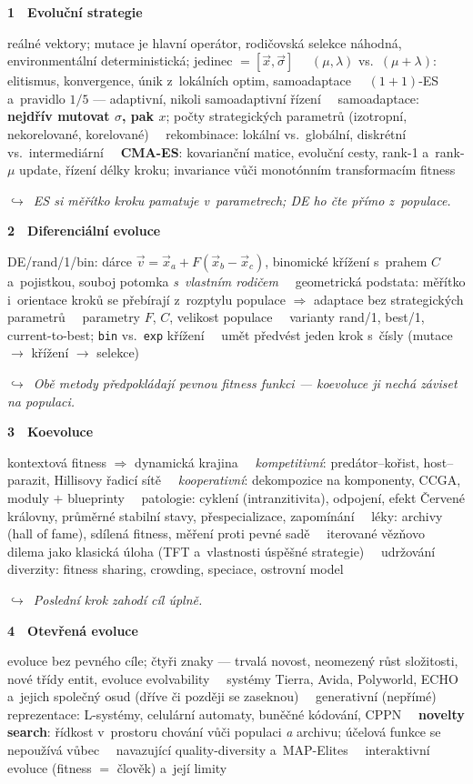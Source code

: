 \documentclass[11pt,a4paper]{article}
\newcommand{\tb}{\ \textcolor{defframe}{\textbullet}\ }
\newcommand{\blok}[2]{\par\addvspace{2.4mm}\noindent
  \textcolor{blokcol}{\textbf{#1}}\ \ \textbf{#2}\par\nobreak}
\newcommand{\tema}[1]{\par\nobreak\noindent #1\par}
\newcommand{\most}[1]{\par\nobreak\noindent
  {\small\itshape\textcolor{mostcol}{$\hookrightarrow$\ #1}}\par}
\begin{document}
\blok{1}{Evoluční strategie}
\tema{reálné vektory; mutace je hlavní operátor, rodičovská selekce náhodná,
environmentální deterministická; jedinec $= [\vec x, \vec\sigma]$
\tb $(\mu,\lambda)$ vs.\ $(\mu+\lambda)$: elitismus, konvergence, únik z~lokálních optim,
samoadaptace
\tb $(1+1)$-ES a~pravidlo $1/5$ --- adaptivní, nikoli samoadaptivní řízení
\tb samoadaptace: \textbf{nejdřív mutovat $\sigma$, pak $x$}; počty strategických parametrů
(izotropní, nekorelované, korelované)
\tb rekombinace: lokální vs.\ globální, diskrétní vs.\ intermediární
\tb \textbf{CMA-ES}: kovarianční matice, evoluční cesty, rank-1 a~rank-$\mu$ update, řízení
délky kroku; invariance vůči monotónním transformacím fitness}
\most{ES si měřítko kroku pamatuje v~parametrech; DE ho čte přímo z~populace.}

\blok{2}{Diferenciální evoluce}
\tema{DE/rand/1/bin: dárce $\vec v = \vec x_a + F(\vec x_b - \vec x_c)$, binomické křížení
s~prahem $C$ a~pojistkou, souboj potomka \emph{s~vlastním rodičem}
\tb geometrická podstata: měřítko i~orientace kroků se přebírají z~rozptylu populace
$\Rightarrow$ adaptace bez strategických parametrů
\tb parametry $F$, $C$, velikost populace
\tb varianty rand/1, best/1, current-to-best; \texttt{bin} vs.\ \texttt{exp} křížení
\tb umět předvést jeden krok s~čísly (mutace $\to$ křížení $\to$ selekce)}
\most{Obě metody předpokládají pevnou fitness funkci --- koevoluce ji nechá záviset na
populaci.}

\blok{3}{Koevoluce}
\tema{kontextová fitness $\Rightarrow$ dynamická krajina
\tb \emph{kompetitivní}: predátor--kořist, host--parazit, Hillisovy řadicí sítě
\tb \emph{kooperativní}: dekompozice na komponenty, CCGA, moduly $+$ blueprinty
\tb patologie: cyklení (intranzitivita), odpojení, efekt Červené královny, průměrné stabilní
stavy, přespecializace, zapomínání
\tb léky: archivy (hall of fame), sdílená fitness, měření proti pevné sadě
\tb iterované vězňovo dilema jako klasická úloha (TFT a~vlastnosti úspěšné strategie)
\tb udržování diverzity: fitness sharing, crowding, speciace, ostrovní model}
\most{Poslední krok zahodí cíl úplně.}

\blok{4}{Otevřená evoluce}
\tema{evoluce bez pevného cíle; čtyři znaky --- trvalá novost, neomezený růst složitosti,
nové třídy entit, evoluce evolvability
\tb systémy Tierra, Avida, Polyworld, ECHO a~jejich společný osud (dříve či později se
zaseknou)
\tb generativní (nepřímé) reprezentace: L-systémy, celulární automaty, buněčné kódování,
CPPN
\tb \textbf{novelty search}: řídkost v~prostoru chování vůči populaci \emph{a} archivu;
účelová funkce se nepoužívá vůbec
\tb navazující quality-diversity a~MAP-Elites
\tb interaktivní evoluce (fitness $=$ člověk) a~její limity}
\end{document}
